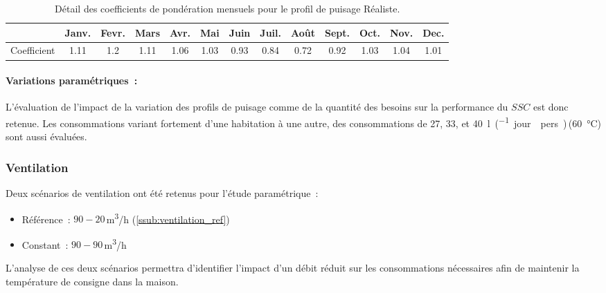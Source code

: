 \begin{table}
\centering
\caption{Détail des coefficients de pondération mensuels pour le profil de
         puisage Réaliste.}
\label{tab:coef_mois}
\begin{tabular}{l*{12}{c}}
    \toprule
                & Janv. & Fevr. & Mars & Avr. & Mai & Juin & Juil. & Août & Sept. & Oct. & Nov. & Dec. \\
    \midrule
    Coefficient & \num{1.11}   & \num{1.2}   & \num{1.11}  & \num{1.06}  & \num{1.03}  & \num{0.93}   & \num{0.84}    & \num{0.72}   & \num{0.92}    & \num{1.03}  & \num{1.04}  & \num{1.01}  \\
    \bottomrule
\end{tabular}
\end{table}

\paragraph{Variations paramétriques~:} %
\label{par:variations_parametriques}
L’évaluation de l’impact de la variation des profils de puisage comme de la quantité des
besoins sur la performance du $SSC$ est donc retenue. Les consommations variant fortement
d’une habitation à une autre, des consommations de \num{27}, \num{33}, et
\SI{40}{\litre\per(jour \period  pers)}\,(\SI{60}{\celsius}) sont aussi évaluées.


\subsubsection{Ventilation} %
\label{ssub:ventilation}
Deux scénarios de ventilation ont été retenus pour l’étude paramétrique~:
\begin{itemize}
    \item Référence~: $90-20$\,\si[per-mode=symbol]{\meter\cubed\per\hour} (\ref{ssub:ventilation_ref})
    \item Constant~: $90-90$\,\si[per-mode=symbol]{\meter\cubed\per\hour}
\end{itemize}
L’analyse de ces deux scénarios permettra d’identifier l’impact d’un débit réduit sur
les consommations nécessaires afin de maintenir la température de consigne dans la
maison.


